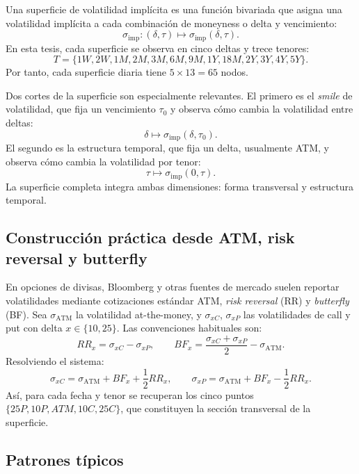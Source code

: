\documentclass[a4paper,11pt]{article}
\newcommand{\SVI}{superficie de volatilidad implícita}
\begin{document}
Una \SVI{} es una función bivariada que asigna una volatilidad implícita a cada combinación de moneyness o delta y vencimiento:
\[
  \sigma_{\text{imp}}:(\delta,\tau)\mapsto \sigma_{\text{imp}}(\delta,\tau).
\]
En esta tesis, cada superficie se observa en cinco deltas y trece tenores:
\[
T=\{1W,2W,1M,2M,3M,6M,9M,1Y,18M,2Y,3Y,4Y,5Y\}.
\]
Por tanto, cada superficie diaria tiene \(5\times 13=65\) nodos.

Dos cortes de la superficie son especialmente relevantes. El primero es el \emph{smile} de volatilidad, que fija un vencimiento \(\tau_0\) y observa cómo cambia la volatilidad entre deltas:
\[
  \delta\mapsto \sigma_{\text{imp}}(\delta,\tau_0).
\]
El segundo es la estructura temporal, que fija un delta, usualmente ATM, y observa cómo cambia la volatilidad por tenor:
\[
  \tau\mapsto \sigma_{\text{imp}}(0,\tau).
\]
La superficie completa integra ambas dimensiones: forma transversal y estructura temporal.

\subsection{Construcción práctica desde ATM, risk reversal y butterfly}

En opciones de divisas, Bloomberg y otras fuentes de mercado suelen reportar volatilidades mediante cotizaciones estándar ATM, \emph{risk reversal} (RR) y \emph{butterfly} (BF). Sea \(\sigma_{\text{ATM}}\) la volatilidad at-the-money, y \(\sigma_{xC}\), \(\sigma_{xP}\) las volatilidades de call y put con delta \(x\in\{10,25\}\). Las convenciones habituales son:
\[
  RR_x=\sigma_{xC}-\sigma_{xP},
  \qquad
  BF_x=\frac{\sigma_{xC}+\sigma_{xP}}{2}-\sigma_{\text{ATM}}.
\]
Resolviendo el sistema:
\[
  \sigma_{xC}=\sigma_{\text{ATM}}+BF_x+\frac{1}{2}RR_x,
  \qquad
  \sigma_{xP}=\sigma_{\text{ATM}}+BF_x-\frac{1}{2}RR_x.
\]
Así, para cada fecha y tenor se recuperan los cinco puntos \(\{25P,10P,ATM,10C,25C\}\), que constituyen la sección transversal de la superficie.

\subsection{Patrones típicos}
\end{document}
